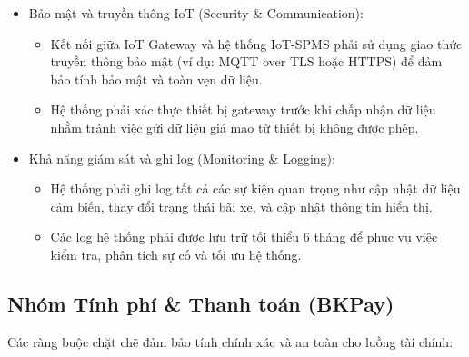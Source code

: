 \begin{itemize}
    \item Bảo mật và truyền thông IoT (Security \& Communication):
    \begin{itemize}
        \item Kết nối giữa IoT Gateway và hệ thống IoT-SPMS phải sử dụng giao thức truyền thông bảo mật (ví dụ: MQTT over TLS hoặc HTTPS) để đảm bảo tính bảo mật và toàn vẹn dữ liệu.
        \item Hệ thống phải xác thực thiết bị gateway trước khi chấp nhận dữ liệu nhằm tránh việc gửi dữ liệu giả mạo từ thiết bị không được phép.
    \end{itemize}

    \item Khả năng giám sát và ghi log (Monitoring \& Logging):
    \begin{itemize}
        \item Hệ thống phải ghi log tất cả các sự kiện quan trọng như cập nhật dữ liệu cảm biến, thay đổi trạng thái bãi xe, và cập nhật thông tin hiển thị.
        \item Các log hệ thống phải được lưu trữ tối thiểu 6 tháng để phục vụ việc kiểm tra, phân tích sự cố và tối ưu hệ thống.
    \end{itemize}
\end{itemize}

\subsection{Nhóm Tính phí \& Thanh toán (BKPay)}
Các ràng buộc chặt chẽ đảm bảo tính chính xác và an toàn cho luồng tài chính:


